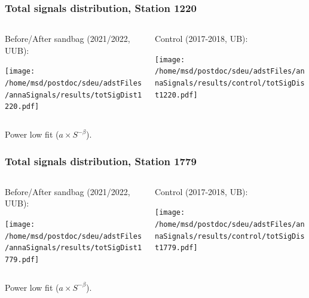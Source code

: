 \documentclass[aspectratio=169]{beamer}
\begin{document}
\begin{frame}
  \frametitle{Total signals distribution, Station 1220}
  
  \begin{columns}[T,c]
    \begin{column}{.5\textwidth}
      Before/After sandbag (2021/2022, UUB):
      \vspace{.3cm}

      \texttt{[image: /home/msd/postdoc/sdeu/adstFiles/annaSignals/results/totSigDist1220.pdf]}
    \end{column}
    \begin{column}{.5\textwidth}
      Control (2017-2018, UB):
      \vspace{0.3cm}

      \texttt{[image: /home/msd/postdoc/sdeu/adstFiles/annaSignals/results/control/totSigDist1220.pdf]}
    \end{column}
  \end{columns}
  \vspace{0.5cm}

  Power low fit ($a\times S^{-\beta}$).
\end{frame}

\begin{frame}
  \frametitle{Total signals distribution, Station 1779}
  
  \begin{columns}[T,c]
    \begin{column}{.5\textwidth}
      Before/After sandbag (2021/2022, UUB):
      \vspace{.3cm}

      \texttt{[image: /home/msd/postdoc/sdeu/adstFiles/annaSignals/results/totSigDist1779.pdf]}
    \end{column}
    \begin{column}{.5\textwidth}
      Control (2017-2018, UB):
      \vspace{0.3cm}

      \texttt{[image: /home/msd/postdoc/sdeu/adstFiles/annaSignals/results/control/totSigDist1779.pdf]}
    \end{column}
  \end{columns}
  \vspace{0.5cm}

  Power low fit ($a\times S^{-\beta}$).
\end{frame}
\end{document}
